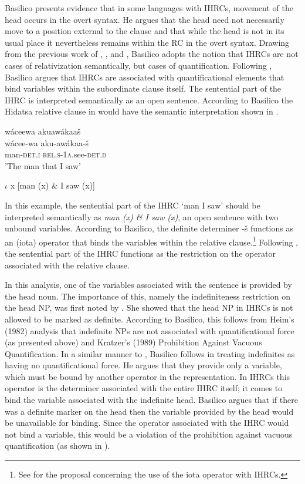 \documentclass[output=paper]{LSP/langsci}
\begin{document}
Basilico presents evidence that in some languages with IHRCs, movement of the head occurs in the overt syntax. He argues that the head need not necessarily move to a position external to the clause and that while the head is not in its usual place it nevertheless remains within the RC in the overt syntax. Drawing from the previous work of \citet{Williamson1987}, \citet{Jelinek1987}, and \citet{Culy1990}, Basilico adopts the notion that IHRCs are not cases of relativization semantically, but cases of quantification. Following \citet{Heim1982}, Basilico argues that IHRCs are associated with quantificational elements that bind variables within the subordinate clause itself. The sentential part of the IHRC is interpreted semantically as an open sentence. According to Basilico the Hidatsa relative clause in  would have the semantic interpretation shown in .

\ea \label{boyle42}
\glll w\'aceewa     akuaw\'akaa\v{s}\\
w\'acee-wa       aku-aw\'akaa-\v{s}\\
man-\textsc{det.i}  \textsc{rel.s-1a}.see-\textsc{det.d}\\
\trans 'The man that I saw'
\z

\ea \label{boyle43}
 $\iota$ x [man (x) \& I saw (x)]  
\z

In this example, the sentential part of the IHRC `man I saw' should be interpreted semantically as \textit{man (x) \& I saw (x)}, an open sentence with two unbound variables.  According to Basilico, the definite determiner -\v{s} functions as an (iota) operator that binds the variables within the relative clause.\footnote{See \citet{Jelinek1987} for the proposal concerning the use of the iota operator with IHRCs.} Following \citet{Culy1990}, the sentential part of the IHRC functions as the restriction on the operator associated with the relative clause.  

In this analysis, one of the variables associated with the sentence is provided by the head noun. The importance of this, namely the indefiniteness restriction on the head NP, was first noted by \citet{Williamson1987}. She showed that the head NP in IHRCs is not allowed to be marked as definite. According to Basilico, this follows from Heim's (1982) analysis that indefinite NPs are not associated with quantificational force (as presented above) and Kratzer's (1989) Prohibition Against Vacuous Quantification. In a similar manner to \citet{Culy1990}, Basilico follows \citet{Heim1982} in treating indefinites as having no quantificational force. He argues that they provide only a variable, which must be bound by another operator in the representation. In IHRCs this operator is the determiner associated with the entire IHRC itself; it comes to bind the variable associated with the indefinite head. Basilico argues that if there was a definite marker on the head then the variable provided by the head would be unavailable for binding. Since the operator associated with the IHRC would not bind a variable, this would be a violation of the prohibition against vacuous quantification (as shown in ).
\end{document}
